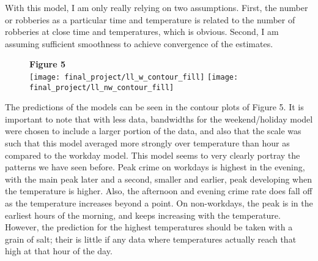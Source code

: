 \documentclass[11pt]{article}
\theoremstyle{definition}
\begin{document}
With this model, I am only really relying on two assumptions. First, the number or robberies as a particular time and temperature is related to the number of robberies at close time and temperatures, which is obvious. Second, I am assuming sufficient smoothness to achieve convergence of the estimates. \par
\begin{figure}[h]
    {\bf Figure 5} \\
    \texttt{[image: final\_project/ll\_w\_contour\_fill]}
    \texttt{[image: final\_project/ll\_nw\_contour\_fill]}
\end{figure}
\FloatBarrier
The predictions of the models can be seen in the contour plots of Figure 5. It is important to note that with less data, bandwidths for the weekend/holiday model were chosen to include a larger portion of the data, and also that the scale was such that this model averaged more strongly over temperature than hour as compared to the workday model. This model seems to very clearly portray the patterns we have seen before. Peak crime on workdays is highest in the evening, with the main peak later and a second, smaller and earlier, peak developing when the temperature is higher. Also, the afternoon and evening crime rate does fall off as the temperature increases beyond a point. On non-workdays, the peak is in the earliest hours of the morning, and keeps increasing with the temperature. However, the prediction for the highest temperatures should be taken with a grain of salt; their is little if any data where temperatures actually reach that high at that hour of the day.
\FloatBarrier
\end{document}
